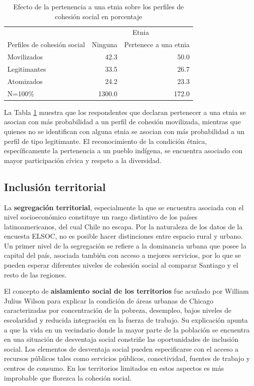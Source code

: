 \documentclass[
  12pt,
]{book}
\begin{document}
\begin{table}

\caption{\label{tab:clases-etnia}Efecto de la pertenencia a una etnia sobre los perfiles de cohesión social en porcentaje}
\centering
\begin{tabular}[t]{l|r|r}
\hline
\multicolumn{1}{c|}{ } & \multicolumn{2}{c}{Etnia} \\
\cline{2-3}
Perfiles de cohesión social & Ninguna & Pertenece a una etnia\\
\hline
Movilizados & 42.3 & 50.0\\
\hline
Legitimantes & 33.5 & 26.7\\
\hline
Atomizados & 24.2 & 23.3\\
\hline
N=100\% & 1300.0 & 172.0\\
\hline
\end{tabular}
\end{table}

La Tabla \ref{tab:clases-etnia} muestra que los respondentes que declaran pertenecer a una etnia se asocian con más probabilidad a un perfil de cohesión movilizada, mientras que quienes no se identifican con alguna etnia se asocian con más probabilidad a un perfil de tipo legitimante. El reconocimiento de la condición étnica, específicamente la pertenencia a un pueblo indígena, se encuentra asociado con mayor participación cívica y respeto a la diversidad.

\hypertarget{inclusiuxf3n-territorial}{%
\subsection{Inclusión territorial}\label{inclusiuxf3n-territorial}}

La \textbf{segregación territorial}, especialmente la que se encuentra asociada con el nivel socioeconómico constituye un rasgo distintivo de los países latinoamericanos, del cual Chile no escapa. Por la naturaleza de los datos de la encuesta ELSOC, no es posible hacer distinciones entre espacio rural y urbano. Un primer nivel de la segregación se refiere a la dominancia urbana que posee la capital del país, asociada también con acceso a mejores servicios, por lo que se pueden esperar diferentes niveles de cohesión social al comparar Santiago y el resto de las regiones.

El concepto de \textbf{aislamiento social de los territorios} fue acuñado por William Julius Wilson para explicar la condición de áreas urbanas de Chicago caracterizadas por concentración de la pobreza, desempleo, bajos niveles de escolaridad y reducida integración en la fuerza de trabajo. Su explicación apunta a que la vida en un vecindario donde la mayor parte de la población se encuentra en una situación de desventaja social constriñe las oportunidades de inclusión social. Los elementos de desventaja social pueden especificarse con el acceso a recursos públicos tales como servicios públicos, conectividad, fuentes de trabajo y centros de consumo. En los territorios limitados en estos aspectos es más improbable que florezca la cohesión social.
\end{document}

